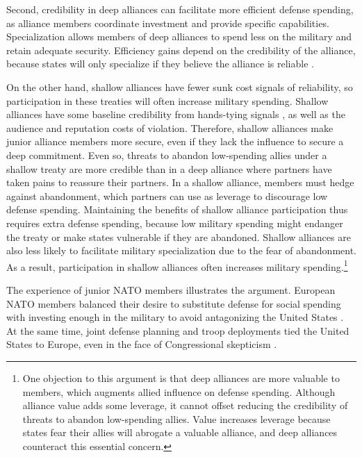 \documentclass[12pt]{article}
\begin{document}
Second, credibility in deep alliances can facilitate more efficient defense spending, as alliance members coordinate investment and provide specific capabilities. 
Specialization allows members of deep alliances to spend less on the military and retain adequate security.
Efficiency gains depend on the credibility of the alliance, because states will only specialize if they believe the alliance is reliable \citep{Leeds2003a}.  


On the other hand, shallow alliances have fewer sunk cost signals of reliability, so participation in these treaties will often increase military spending. 
Shallow alliances have some baseline credibility from hands-tying signals \citep{Fearon1997}, as well as the audience \citep{Morrow2000} and reputation \citep{Gibler2008, Crescenzietal2012} costs of violation.
Therefore, shallow alliances make junior alliance members more secure, even if they lack the influence to secure a deep commitment. 
Even so, threats to abandon low-spending allies under a shallow treaty are more credible than in a deep alliance where partners have taken pains to reassure their partners.  
In a shallow alliance, members must hedge against abandonment, which partners can use as leverage to discourage low defense spending. 
Maintaining the benefits of shallow alliance participation thus requires extra defense spending, because low military spending might endanger the treaty or make states vulnerable if they are abandoned. 
Shallow alliances are also less likely to facilitate military specialization due to the fear of abandonment. 
As a result, participation in shallow alliances often increases military spending.\footnote{
One objection to this argument is that deep alliances are more valuable to members, which augments allied influence on defense spending. 
Although alliance value adds some leverage, it cannot offset reducing the credibility of threats to abandon low-spending allies.
Value increases leverage because states fear their allies will abrogate a valuable alliance, and deep alliances counteract this essential concern. 
}


The experience of junior NATO members illustrates the argument. 
European NATO members balanced their desire to substitute defense for social spending with investing enough in the military to avoid antagonizing the United States \citep[pg. 182-3]{Sayle2019}.
At the same time, joint defense planning and troop deployments tied the United States to Europe, even in the face of Congressional skepticism \citep[pg 175]{Sayle2019}. 
 
\end{document}
